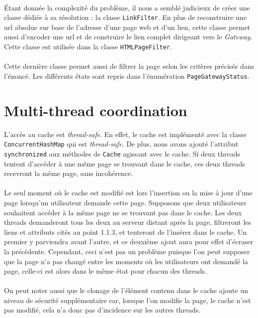 \documentclass[a4paper,11pt]{article}
\begin{document}
\paragraph{}
Étant donnée la complexité du problème, il nous a semblé judicieux de créer une classe dédiée à sa résolution : la classe \texttt{LinkFilter}. En plus de reconstruire une url absolue sur base de l'adresse d'une page web et d'un lien, cette classe permet aussi d'encoder une url et de construire le lien complet dirigeant vers le \textit{Gateway}. Cette classe est utilisée dans la classe \texttt{HTMLPageFilter}.
\paragraph{}
Cette dernière classe permet aussi de filtrer la page selon les critères précisés dans l'énoncé. Les différents états sont repris dans l'énumération \texttt{PageGatewayStatus}.

\section{Multi-thread coordination}
L'accès au cache est \textit{thread-safe}. En effet, le cache est implémenté avec la classe \texttt{ConcurrentHashMap} qui est \textit{thread-safe}. De plus, nous avons ajouté l'attribut \texttt{synchronized} aux méthodes de \texttt{Cache} agissant avec le cache. Si deux threads tentent d'accéder à une même page se trouvant dans le cache, ces deux threads recevront la même page, sans incohérence.
\paragraph{}
Le seul moment où le cache est modifié est lors l'insertion ou la mise à jour d'une page lorsqu'un utilisateur demande cette page. Supposons que deux utilisateurs souhaitent accéder à la même page ne se trouvant pas dans le cache. Les deux threads demanderont tous les deux au serveur distant après la page, filtreront les liens et attributs cités au point 1.1.3, et tenteront de l'insérer dans le cache. Un premier y parviendra avant l'autre, et ce deuxième ajout aura pour effet d'écraser la précédente. Cependant, ceci n'est pas un problème puisque l'on peut supposer que la page n'a pas changé entre les moments où les utilisateurs ont demandé la page, celle-ci est alors dans le même état pour chacun des threads.
\paragraph{}
On peut noter aussi que le clonage de l'élément contenu dans le cache ajoute un niveau de sécurité supplémentaire car, lorsque l'on modifie la page, le cache n'est pas modifié, cela n'a donc pas d'incidence sur les autres threads.
\end{document}
